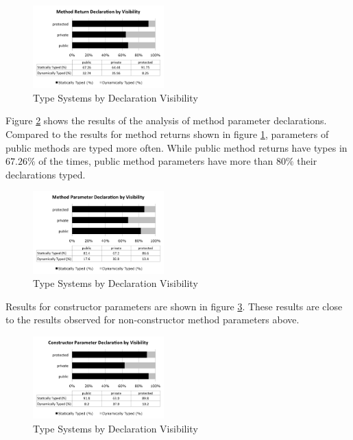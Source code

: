 \documentclass[preprint]{sigplanconf}
\begin{document}
\begin{figure}[ht]
\centering \includegraphics[width=0.45\textwidth]{method_return_visibility} 
\caption{Type Systems by Declaration Visibility}
\label{fig:method_return_visibility} 
\end{figure}

Figure \ref{fig:method_parameter_visibility} shows the results of the analysis of method parameter declarations. 
Compared to the results for method returns shown in figure \ref{fig:method_return_visibility}, parameters of public methods are typed more often.
While public method returns have types in $67.26\%$ of the times, public method parameters have more than $80\%$ their declarations typed.

\begin{figure}[ht]
\centering \includegraphics[width=0.45\textwidth]{method_parameter_visibility} 
\caption{Type Systems by Declaration Visibility}
\label{fig:method_parameter_visibility} 
\end{figure}

Results for constructor parameters are shown in figure \ref{fig:constructor_parameter_visibility}.
These results are close to the results observed for non-constructor method parameters above. 

\begin{figure}[ht]
\centering \includegraphics[width=0.45\textwidth]{constructor_parameter_visibility} 
\caption{Type Systems by Declaration Visibility}
\label{fig:constructor_parameter_visibility} 
\end{figure}
\end{document}
